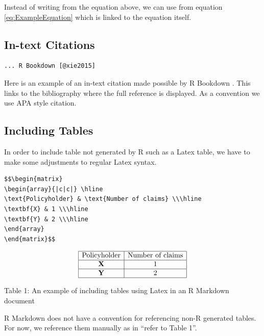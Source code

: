 \documentclass[]{book}
\theoremstyle{definition}
\theoremstyle{definition}
\theoremstyle{definition}
\theoremstyle{remark}
\begin{document}
Instead of writing from the equation above, we can use from equation
\eqref{eq:ExampleEquation} which is linked to the equation itself.

\subsection{In-text Citations}\label{in-text-citations}

\begin{verbatim}
... R Bookdown [@xie2015]
\end{verbatim}

Here is an example of an in-text citation made possible by R Bookdown
\citep{xie2015}. This links to the bibliography where the full reference
is displayed. As a convention we use APA style citation.

\subsection{Including Tables}\label{including-tables}

In order to include table not generated by R such as a Latex table, we
have to make some adjustments to regular Latex syntax.

\begin{verbatim}
$$\begin{matrix}
\begin{array}{|c|c|} \hline
\text{Policyholder} & \text{Number of claims} \\\hline
\textbf{X} & 1 \\\hline
\textbf{Y} & 2 \\\hline
\end{array}
\end{matrix}$$
\end{verbatim}

\[\begin{matrix}
\begin{array}{|c|c|} \hline
\text{Policyholder} & \text{Number of claims} \\\hline
\textbf{X} & 1 \\\hline
\textbf{Y} & 2 \\\hline
\end{array}
\end{matrix}\]

Table 1: An example of including tables using Latex in an R Markdown
document

R Markdown does not have a convention for referencing non-R generated
tables. For now, we reference them manually as in ``refer to Table 1''.
\end{document}
